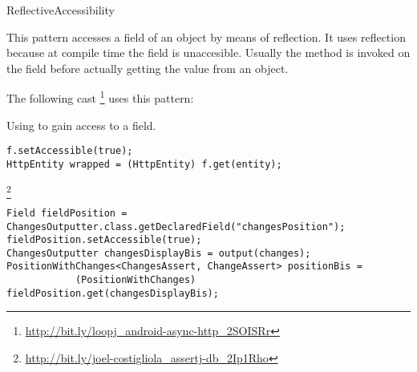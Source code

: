 
\begin{pattern}{ReflectiveAccessibility}

This pattern accesses a field of an object by means of reflection.
It uses reflection because at compile time the field is unaccesible.
Usually the method  is invoked on the field
before actually getting the value from an object.

\instances{}
The following cast%
\footnote{\url{http://bit.ly/loopj_android-async-http_2SOISRr}}
uses this pattern:

\begin{listing}
\caption{Using  to gain access to a field.}
\begin{verbatim}
f.setAccessible(true);
HttpEntity wrapped = (HttpEntity) f.get(entity);
\end{verbatim}
\end{listing}

\footnote{\url{http://bit.ly/joel-costigliola_assertj-db_2Ip1Rho}}

\begin{verbatim}
Field fieldPosition = ChangesOutputter.class.getDeclaredField("changesPosition");
fieldPosition.setAccessible(true);
ChangesOutputter changesDisplayBis = output(changes);
PositionWithChanges<ChangesAssert, ChangeAssert> positionBis = 
            (PositionWithChanges) fieldPosition.get(changesDisplayBis);
\end{verbatim}



\end{pattern}
